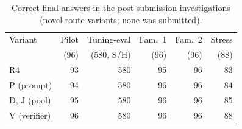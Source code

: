 \begin{table}[t]
\caption{Correct final answers in the post-submission investigations (novel-route variants; none was submitted).}
\label{tab:post}
\centering
\scriptsize
\setlength{\tabcolsep}{4pt}
\begin{tabular}{@{}lrrrrr@{}}
\toprule
Variant & Pilot & Tuning-eval & Fam.\ 1 & Fam.\ 2 & Stress \\
 & (96) & (580, S/H) & (96) & (96) & (88) \\
\midrule
R4 & 93 & 580 & 95 & 96 & 83 \\
P (prompt) & 94 & 580 & 96 & 96 & 84 \\
D, J (pool) & 95 & 580 & 96 & 96 & 85 \\
V (verifier) & 96 & 580 & 96 & 96 & 88 \\
\bottomrule
\end{tabular}
\end{table}
